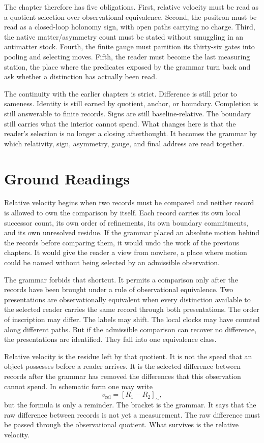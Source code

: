 The chapter therefore has five obligations. First, relative velocity must be
read as a quotient selection over observational equivalence. Second, the
positron must be read as a closed-loop holonomy sign, with open paths carrying
no charge. Third, the native matter/asymmetry count must be stated without
smuggling in an antimatter stock. Fourth, the finite gauge must partition
its thirty-six gates into pooling and selecting moves. Fifth, the reader must
become the last measuring station, the place where the predicates exposed by
the grammar turn back and ask whether a distinction has actually been read.

The continuity with the earlier chapters is strict. Difference is still
prior to sameness. Identity is still earned by quotient, anchor, or boundary.
Completion is still answerable to finite records. Signs are still
baseline-relative. The boundary still carries what the interior cannot spend.
What changes here is that the reader's selection is no longer a closing
afterthought. It becomes the grammar by which relativity, sign, asymmetry,
gauge, and final address are read together.

\section{Ground Readings}

Relative velocity begins when two records must be compared and neither record
is allowed to own the comparison by itself. Each record carries its own local
successor count, its own order of refinements, its own boundary commitments,
and its own unresolved residue. If the grammar placed an absolute motion
behind the records before comparing them, it would undo the work of the
previous chapters. It would give the reader a view from nowhere, a place
where motion could be named without being selected by an admissible
observation.

The grammar forbids that shortcut. It permits a comparison only after the
records have been brought under a rule of observational equivalence. Two
presentations are observationally equivalent when every distinction available
to the selected reader carries the same record through both presentations.
The order of inscription may differ. The labels may shift. The local clocks
may have counted along different paths. But if the admissible comparison can
recover no difference, the presentations are identified. They fall into one
equivalence class.

Relative velocity is the residue left by that quotient. It is not the speed
that an object possesses before a reader arrives. It is the selected
difference between records after the grammar has removed the differences that
this observation cannot spend. In schematic form one may write
\[
  v_{\mathrm{rel}} = [R_1 - R_2]_{\sim},
\]
but the formula is only a reminder. The bracket is the grammar. It says that
the raw difference between records is not yet a measurement. The raw
difference must be passed through the observational quotient. What survives
is the relative velocity.

